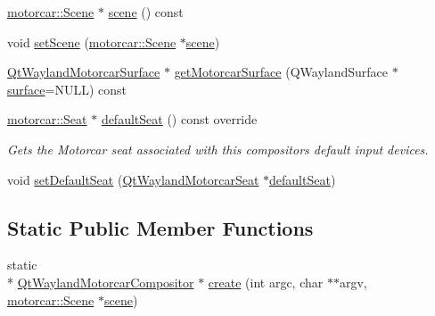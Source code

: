 \begin{DoxyCompactItemize}
\item 
\hyperlink{classmotorcar_1_1Scene}{motorcar\-::\-Scene} $\ast$ \hyperlink{classqtmotorcar_1_1QtWaylandMotorcarCompositor_a8bb6c8e6a7acad99b814b192534f3ee2}{scene} () const 
\item 
void \hyperlink{classqtmotorcar_1_1QtWaylandMotorcarCompositor_a2a896748e415515de155c22ef70adeb0}{set\-Scene} (\hyperlink{classmotorcar_1_1Scene}{motorcar\-::\-Scene} $\ast$\hyperlink{classqtmotorcar_1_1QtWaylandMotorcarCompositor_a8bb6c8e6a7acad99b814b192534f3ee2}{scene})
\item 
\hyperlink{classqtmotorcar_1_1QtWaylandMotorcarSurface}{Qt\-Wayland\-Motorcar\-Surface} $\ast$ \hyperlink{classqtmotorcar_1_1QtWaylandMotorcarCompositor_a97c4d656c14bd2b6877405d5003fb741}{get\-Motorcar\-Surface} (Q\-Wayland\-Surface $\ast$\hyperlink{simple-egl_8cpp_a0720952aa1caded45b5bcdce589663a9}{surface}=N\-U\-L\-L) const 
\item 
\hyperlink{classmotorcar_1_1Seat}{motorcar\-::\-Seat} $\ast$ \hyperlink{classqtmotorcar_1_1QtWaylandMotorcarCompositor_a983fa0aa6bb6cf2b73e5e318fcf4d4ee}{default\-Seat} () const override
\begin{DoxyCompactList}\small\item\em Gets the Motorcar seat associated with this compositors default input devices. \end{DoxyCompactList}\item 
void \hyperlink{classqtmotorcar_1_1QtWaylandMotorcarCompositor_a6ea6591a5e3999156f7418f8a61db992}{set\-Default\-Seat} (\hyperlink{classqtmotorcar_1_1QtWaylandMotorcarSeat}{Qt\-Wayland\-Motorcar\-Seat} $\ast$\hyperlink{classqtmotorcar_1_1QtWaylandMotorcarCompositor_a983fa0aa6bb6cf2b73e5e318fcf4d4ee}{default\-Seat})
\end{DoxyCompactItemize}
\subsection*{Static Public Member Functions}
\begin{DoxyCompactItemize}
\item 
static \\*
\hyperlink{classqtmotorcar_1_1QtWaylandMotorcarCompositor}{Qt\-Wayland\-Motorcar\-Compositor} $\ast$ \hyperlink{classqtmotorcar_1_1QtWaylandMotorcarCompositor_a169e428e534906108290bb5c4512ca13}{create} (int argc, char $\ast$$\ast$argv, \hyperlink{classmotorcar_1_1Scene}{motorcar\-::\-Scene} $\ast$\hyperlink{classqtmotorcar_1_1QtWaylandMotorcarCompositor_a8bb6c8e6a7acad99b814b192534f3ee2}{scene})
\end{DoxyCompactItemize}
